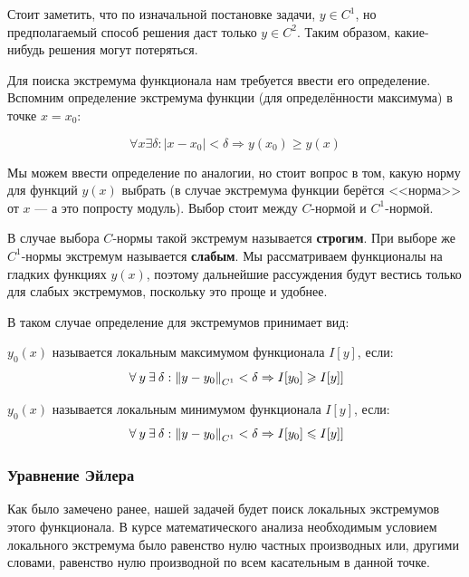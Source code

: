 \documentclass[12pt]{article}
\begin{document}

		Стоит заметить, что по изначальной постановке задачи, $y \in C^1$, но предполагаемый способ решения
		даст только $y \in C^2$. Таким образом, какие-нибудь решения могут потеряться. 

		Для поиска экстремума функционала нам требуется ввести его определение. Вспомним определение экстремума функции (для определённости максимума) в точке $x=x_0$:

			$$\forall x \exists \delta: |x - x_0| < \delta \Rightarrow y(x_0) \geq y(x)$$

		Мы можем ввести определение по аналогии, но стоит вопрос в том, какую норму для функций $y(x)$ выбрать (в случае экстремума функции берётся <<норма>> от $x$ --- а это попросту модуль). Выбор стоит между $C$-нормой и $C^1$-нормой.

		В случае выбора $C$-нормы такой экстремум называется \textbf{строгим}. При выборе же $C^1$-нормы экстремум называется \textbf{слабым}. Мы рассматриваем функционалы на гладких функциях $y(x)$, поэтому дальнейшие рассуждения будут вестись только для слабых экстремумов, поскольку это проще и удобнее.

		В таком случае определение для экстремумов принимает вид:

		\begin{defi}
			$y_0(x)$ называется локальным максимумом функционала $I[y]$, если:
			$$\forall y \exists \delta: \norm{y - y_0}_{C^1} < \delta \Rightarrow I[y_0] \geq I[y]]$$
		\end{defi}

		\begin{defi}
			$y_0(x)$ называется локальным минимумом функционала $I[y]$, если:
			$$\forall y \exists \delta: \norm{y - y_0}_{C^1} < \delta \Rightarrow I[y_0] \leq I[y]]$$
		\end{defi}

	
		\subsubsection{Уравнение Эйлера}
	
			Как было замечено ранее, нашей задачей будет поиск локальных экстремумов этого функционала. В 
			курсе математического анализа необходимым условием локального экстремума было равенство нулю
			частных производных или, другими словами, равенство нулю производной по всем касательным в данной
			точке.
	
\end{document}
